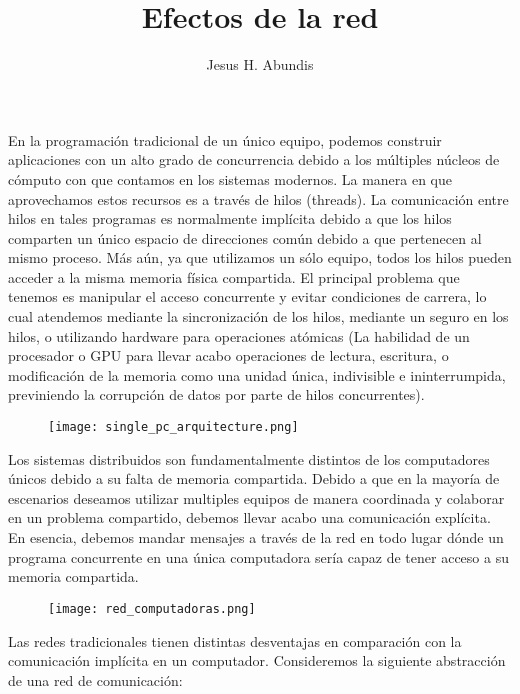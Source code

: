 \documentclass[12pt]{article}
\begin{document}
\title{Efectos de la red}
\author{Jesus H. Abundis}
\maketitle
\thispagestyle{empty}

En la programación tradicional de un único equipo, 
podemos construir aplicaciones con un alto grado de concurrencia debido a los múltiples núcleos de cómputo con que contamos en los sistemas modernos.
La manera en que aprovechamos estos recursos es a través de hilos (threads).
La comunicación entre hilos en tales programas es normalmente implícita debido a que los hilos comparten un único espacio de direcciones común debido a que pertenecen al mismo proceso.
Más aún, 
ya que utilizamos un sólo equipo, 
todos los hilos pueden acceder a la misma memoria física compartida.
El principal problema que tenemos es manipular el acceso concurrente y evitar condiciones de carrera, 
lo cual atendemos mediante la sincronización de los hilos,
mediante un seguro en los hilos,
o utilizando hardware para operaciones atómicas 
(La habilidad de un procesador o GPU para llevar acabo operaciones de lectura, escritura, o modificación de la memoria como una unidad única, indivisible e ininterrumpida, previniendo la corrupción de datos por parte de hilos concurrentes).

\begin{figure}[h]
   \centering
   \texttt{[image: single\_pc\_arquitecture.png]}
\end{figure}

Los sistemas distribuidos son fundamentalmente distintos de los computadores únicos debido a su falta de memoria compartida.
Debido a que en la mayoría de escenarios deseamos utilizar multiples equipos de manera coordinada y colaborar en un problema compartido,
debemos llevar acabo una comunicación explícita.
En esencia, debemos mandar mensajes a través de la red en todo lugar dónde un programa concurrente en una única computadora sería capaz de tener acceso a su memoria compartida.

\begin{figure}[h]
   \centering
   \texttt{[image: red\_computadoras.png]}
\end{figure}


Las redes tradicionales tienen distintas desventajas en comparación con la comunicación implícita en un computador. 
Consideremos la siguiente abstracción de una red de comunicación:
\end{document}
